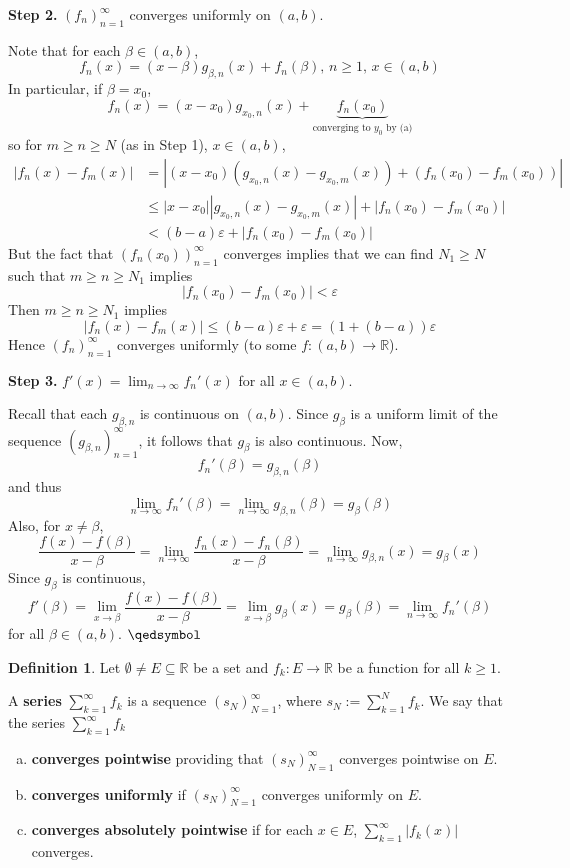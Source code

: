 \documentclass[11pt]{article}
\theoremstyle{definition}
\newtheorem{defn}[thm]{Definition}
\newcommand{\mbR}{\ensuremath{\mathbb{R}}}
\begin{document}
\textbf{Step 2.} $(f_n)_{n=1}^\infty$ converges uniformly on $(a, b)$. 

Note that for each $\beta \in (a, b)$, 
$$f_n(x) = (x - \beta)g_{\beta, n}(x) + f_n(\beta), \, n\geq1, \, x \in (a, b)$$
In particular, if $\beta = x_0$,
$$f_n(x) = (x - x_0) g_{x_0, n}(x) + \underbrace{ f_n(x_0) }_{\text{converging to $y_0$ by (a)}}$$
so for $m \geq n \geq N$ (as in Step 1), $x \in (a, b)$,
\begin{align*}
|f_n(x) - f_m(x)| & = \left|(x - x_0)\left(g_{x_0, n}(x) - g_{x_0, m}(x)\right) + \left(f_n(x_0) - f_m(x_0)\right)\right| \\
& \leq |x - x_0| |g_{x_0, n}(x) - g_{x_0, m}(x)| + |f_n(x_0) - f_m(x_0)| \\
& < (b-a)\varepsilon + |f_n(x_0) - f_m(x_0)| 
\end{align*}
But the fact that $\left(f_n(x_0)\right)_{n=1}^\infty$ converges implies that we can find $N_1 \geq N$ such that $m \geq n \geq N_1$ implies
$$|f_n(x_0) - f_m(x_0)| < \varepsilon$$
Then $m \geq n \geq N_1$ implies
$$|f_n(x) - f_m(x)| \leq (b-a)\varepsilon + \varepsilon = \left(1 + (b-a)\right)\varepsilon$$
Hence $(f_n)_{n=1}^\infty$ converges uniformly (to some $f : (a, b) \to \mbR$). 

\textbf{Step 3.} $f'(x) = \lim_{n\to\infty} f_n'(x)$ for all $x \in (a, b)$. 

Recall that each $g_{\beta, n}$ is continuous on $(a, b)$. Since $g_{\beta}$ is a uniform limit of the sequence $(g_{\beta, n})_{n=1}^\infty$, it follows that $g_\beta$ is also continuous. Now,
$$f_n'(\beta) = g_{\beta, n}(\beta)$$
and thus
$$\lim_{n\to\infty} f_n'(\beta) = \lim_{n\to\infty} g_{\beta, n}(\beta) = g_\beta (\beta)$$
Also, for $x \ne \beta$,
$$\frac{f(x) - f(\beta)}{x-\beta} = \lim_{n\to\infty} \frac{f_n(x) - f_n(\beta)}{x-\beta} = \lim_{n\to\infty} g_{\beta, n}(x) = g_\beta (x)$$
Since $g_\beta$ is continuous,
$$f'(\beta) = \lim_{x\to\beta} \frac{f(x) - f(\beta)}{x - \beta} = \lim_{x\to\beta} g_\beta (x) = g_\beta (\beta) = \lim_{n\to\infty} f_n'(\beta)$$
for all $\beta \in (a, b)$. $\qedsymbol$

\begin{defn}
Let $\emptyset \ne E \subseteq \mbR$ be a set and $f_k : E \to \mbR$ be a function for all $k \geq 1$. 

A \textbf{series} $\sum_{k=1}^\infty f_k$ is a sequence $(s_N)_{N=1}^\infty$, where $s_N := \sum_{k=1}^N f_k$. We say that the series $\sum_{k=1}^\infty f_k$
\begin{enumerate}[(a)] \vspace{-0.2cm}
\item \textbf{converges pointwise} providing that $(s_N)_{N=1}^\infty$ converges pointwise on $E$.
\item \textbf{converges uniformly} if $(s_N)_{N=1}^\infty$ converges uniformly on $E$.
\item \textbf{converges absolutely pointwise} if for each $x \in E$, $\sum_{k=1}^\infty |f_k(x)|$ converges.
\end{enumerate}
\end{defn}
\end{document}

